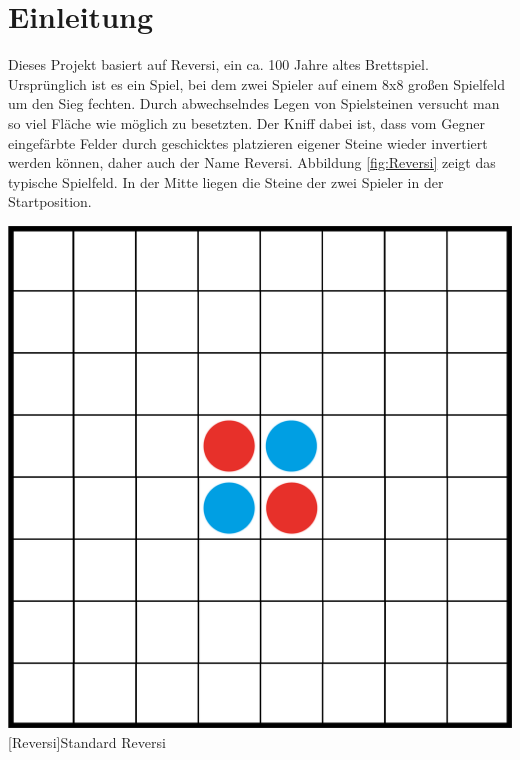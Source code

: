 \documentclass[12pt,a4paper,bibliography=totocnumbered,listof=totocnumbered]{scrartcl}
\begin{document}
    \section{Einleitung}
    \vspace{1em}

		
    Dieses Projekt basiert auf Reversi, ein ca. 100 Jahre altes Brettspiel. Ursprünglich ist es ein Spiel, bei dem zwei Spieler auf einem 8x8 großen Spielfeld um den Sieg fechten. Durch abwechselndes Legen von Spielsteinen versucht man so viel Fläche wie möglich zu besetzten. Der Kniff dabei ist, dass vom Gegner eingefärbte Felder durch geschicktes platzieren eigener Steine wieder invertiert werden können, daher auch der Name Reversi. Abbildung \ref{fig:Reversi} zeigt das typische Spielfeld. In der Mitte liegen die Steine der zwei Spieler in der Startposition.
    
    \vspace{1em}
    \begin{minipage}{\linewidth}
    	\centering
    	\includegraphics[width=0.6\linewidth]{pics/Kapitel_1/Kapitel_1_pic1.png}
    	[Reversi]{\glqq Standard\grqq{} Reversi }
    	\label{fig:Reversi}
    \end{minipage}
    \vspace{1em}
    
\end{document}
